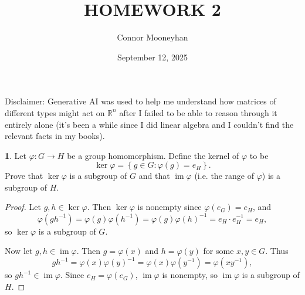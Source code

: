 \documentclass[12pt]{article}
\title{HOMEWORK 2}
\author{Connor Mooneyhan}
\date{September 12, 2025}
\DeclareMathOperator{\im}{im}
\theoremstyle{definition}
\newtheorem{ex}{}
\begin{document}
\maketitle

Disclaimer: Generative AI was used to help me understand how matrices of different types might act on $\mathbb{R}^n$ after I failed to be able to reason through it entirely alone (it's been a while since I did linear algebra and I couldn't find the relevant facts in my books).
\begin{ex}
	Let $\varphi: G \to H$ be a group homomorphism.
	Define the kernel of $\varphi$ to be \begin{equation*}
		\ker \varphi = \left\lbrace g \in G : \varphi(g) = e_H \right\rbrace.
	\end{equation*}
	Prove that $\ker \varphi$ is a subgroup of $G$ and that $\im \varphi$ (i.e. the range of $\varphi$) is a subgroup of $H$.
\end{ex}
\begin{proof}
	Let $g, h \in \ker \varphi$.
	Then $\ker\varphi$ is nonempty since $\varphi(e_G) = e_H$, and \begin{equation*}
		\varphi(gh^{-1}) = \varphi(g)\varphi(h^{-1}) = \varphi(g)\varphi(h)^{-1} =  e_H \cdot e_H^{-1} = e_H,
	\end{equation*}
	so $\ker\varphi$ is a subgroup of $G$.

	Now let $g, h \in \im \varphi$.
	Then $g = \varphi(x)$ and $h = \varphi(y)$ for some $x, y \in G$.
	Thus \begin{equation*}
		gh^{-1} = \varphi(x)\varphi(y)^{-1} = \varphi(x)\varphi(y^{-1}) = \varphi(xy^{-1}),
	\end{equation*}
	so $gh^{-1} \in \im\varphi$.
	Since $e_H = \varphi(e_G)$, $\im\varphi$ is nonempty, so $\im\varphi$ is a subgroup of $H$.
\end{proof}
\end{document}
